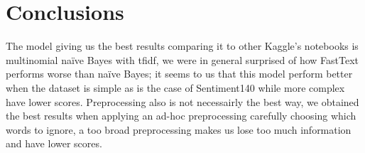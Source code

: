 \section*{Conclusions}

The model giving us the best results comparing it to other Kaggle's notebooks is multinomial na\"ive Bayes with tfidf, we were in general surprised of how FastText performs worse than na\"ive Bayes; it seems to us that this model perform better when the dataset is simple as is the case of Sentiment140 while more complex have lower scores. 
Preprocessing also is not necessairly the best way, we obtained the best results when applying an ad-hoc preprocessing carefully choosing which words to ignore, a too broad preprocessing makes us lose too much information and have lower scores.